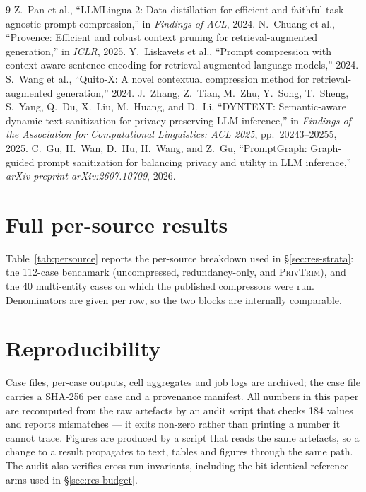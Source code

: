 \documentclass[conference]{IEEEtran}
\newcommand{\ours}{\textsc{PrivTrim}}
\begin{document}
\balance
\begin{thebibliography}{9}
 Z.~Pan et al., ``LLMLingua-2: Data distillation for efficient and
faithful task-agnostic prompt compression,'' in \emph{Findings of ACL}, 2024.
 N.~Chuang et al., ``Provence: Efficient and robust context pruning for
retrieval-augmented generation,'' in \emph{ICLR}, 2025.
 Y.~Liskavets et al., ``Prompt compression with context-aware sentence encoding
for retrieval-augmented language models,'' 2024.
 S.~Wang et al., ``Quito-X: A novel contextual compression method for
retrieval-augmented generation,'' 2024.
 J.~Zhang, Z.~Tian, M.~Zhu, Y.~Song, T.~Sheng, S.~Yang, Q.~Du, X.~Liu,
M.~Huang, and D.~Li, ``DYNTEXT: Semantic-aware dynamic text sanitization for privacy-preserving
LLM inference,'' in \emph{Findings of the Association for Computational Linguistics: ACL 2025},
pp.~20243--20255, 2025.
 C.~Gu, H.~Wan, D.~Hu, H.~Wang, and Z.~Gu, ``PromptGraph: Graph-guided
prompt sanitization for balancing privacy and utility in LLM inference,'' \emph{arXiv
preprint arXiv:2607.10709}, 2026.
\end{thebibliography}

\appendix

\section{Full per-source results}
\label{app:persource}

Table~\ref{tab:persource} reports the per-source breakdown used in \S\ref{sec:res-strata}: the
112-case benchmark (uncompressed, redundancy-only, and \ours{}), and the 40 multi-entity cases
on which the published compressors were run. Denominators are given per row, so the two blocks
are internally comparable.

\section{Reproducibility}
\label{app:repro}

Case files, per-case outputs, cell aggregates and job logs are archived; the case file carries a
SHA-256 per case and a provenance manifest. All numbers in this paper are recomputed from the
raw artefacts by an audit script that checks 184 values and reports mismatches --- it exits
non-zero rather than printing a number it cannot trace. Figures are produced by a script that
reads the same artefacts, so a change to a result propagates to text, tables and figures
through the same path. The audit also verifies cross-run invariants, including the
bit-identical reference arms used in \S\ref{sec:res-budget}.
\end{document}
